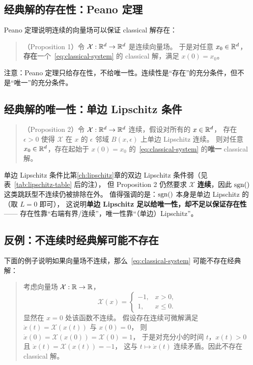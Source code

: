 \subsection{经典解的存在性：Peano 定理}

Peano 定理说明连续的向量场可以保证 classical 解存在：
\begin{quote}
（Proposition 1）令 $\mathcal{X}:\mathbb{R}^d\to\mathbb{R}^d$ 是连续向量场。
于是对任意 $x_0\in\mathbb{R}^d$，\textbf{存在}一个~\eqref{eq:classical-system} 的 classical 解，满足 $x(0)=x_0$。
\end{quote}
注意：Peano 定理只给存在性，不给唯一性。连续性是“存在”的充分条件，但不是“唯一”的充分条件。

\subsection{经典解的唯一性：单边 Lipschitz 条件}

\begin{quote}
（Proposition 2）令 $\mathcal{X}:\mathbb{R}^d\to\mathbb{R}^d$ 连续，假设对所有的 $x\in\mathbb{R}^d$，
存在 $\epsilon>0$ 使得 $\mathcal{X}$ 在 $x$ 的 $\epsilon$ 邻域 $B(x,\epsilon)$ 上单边 Lipschitz 连续。
则对任意 $x_0\in\mathbb{R}^d$，存在起始于 $x(0)=x_0$ 的~\eqref{eq:classical-system} 的\textbf{唯一} classical 解。
\end{quote}
单边 Lipschitz 条件比第\ref{ch:lipschitz}章的双边 Lipschitz 条件弱（见表~\ref{tab:lipschitz-table} 后的注），
但 Proposition 2 仍然要求 $\mathcal{X}$ \textbf{连续}，因此 $\sgn$ 这类跳跃型不连续仍被排除在外。
值得强调的是：$\sgn$ 本身是单边 Lipschitz 的（取 $L=0$ 即可），
这说明\textbf{单边 Lipschitz 足以给唯一性，却不足以保证存在性}——
存在性靠“右端有界/连续”，唯一性靠“（单边）Lipschitz”。

\subsection{反例：不连续时经典解可能不存在}

下面的例子说明如果向量场不连续，那么~\eqref{eq:classical-system} 可能不存在经典解：
\begin{quote}
考虑向量场 $\mathcal{X}:\mathbb{R}\to\mathbb{R}$，
\[
\mathcal{X}(x)=\begin{cases}
-1, & x>0,\\
1,  & x\leq0 .
\end{cases}
\]
显然在 $x=0$ 处该函数不连续。
假设存在连续可微解满足 $\dot{x}(t)=\mathcal{X}(x(t))$ 与 $x(0)=0$，
则 $\dot{x}(0)=\mathcal{X}(x(0))=\mathcal{X}(0)=1$，
于是对充分小的时间 $t$，$x(t)>0$ 且 $\dot{x}(t)=\mathcal{X}(x(t))=-1$，
这与 $t\mapsto\dot{x}(t)$ 连续矛盾。因此不存在 classical 解。
\end{quote}

